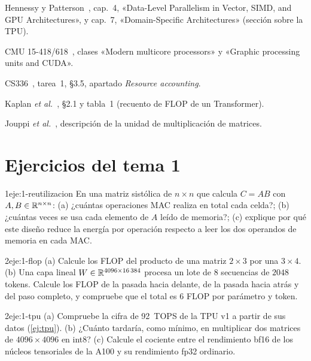 \begin{lecturas}
\item Hennessy y Patterson~\cite{hp}, cap.~4, «Data-Level Parallelism in Vector, SIMD, and GPU Architectures», y cap.~7, «Domain-Specific Architectures» (sección sobre la TPU).
\item CMU 15-418/618~\cite{cmu418}, clases «Modern multicore processors» y «Graphic processing units and CUDA».
\item CS336~\cite{cs336a1}, tarea~1, §3.5, apartado \emph{Resource accounting}.
\item Kaplan \emph{et al.}~\cite{kaplan}, §2.1 y tabla~1 (recuento de FLOP de un Transformer).
\item Jouppi \emph{et al.}~\cite{jouppi}, descripción de la unidad de multiplicación de matrices.
\end{lecturas}

\section*{Ejercicios del tema 1}

\begin{ejercicio}{1}{eje:1-reutilizacion}
En una matriz sistólica de $n\times n$ que calcula $C=AB$ con $A,B\in\mathbb{R}^{n\times n}$: (a) ¿cuántas operaciones MAC realiza en total cada celda?; (b) ¿cuántas veces se usa cada elemento de $A$ leído de memoria?; (c) explique por qué este diseño reduce la energía por operación respecto a leer los dos operandos de memoria en cada MAC.
\end{ejercicio}

\begin{ejercicio}{2}{eje:1-flop}
(a) Calcule los FLOP del producto de una matriz $2\times 3$ por una $3\times 4$. (b) Una capa lineal $W\in\mathbb{R}^{4096\times 16\,384}$ procesa un lote de $8$ secuencias de $2048$ tokens. Calcule los FLOP de la pasada hacia delante, de la pasada hacia atrás y del paso completo, y compruebe que el total es $6$ FLOP por parámetro y token.
\end{ejercicio}

\begin{ejercicio}{2}{eje:1-tpu}
(a) Compruebe la cifra de 92~TOPS de la TPU v1 a partir de sus datos (\cref{ej:tpu}). (b) ¿Cuánto tardaría, como mínimo, en multiplicar dos matrices de $4096\times 4096$ en int8? (c) Calcule el cociente entre el rendimiento bf16 de los núcleos tensoriales de la A100 y su rendimiento fp32 ordinario.
\end{ejercicio}

